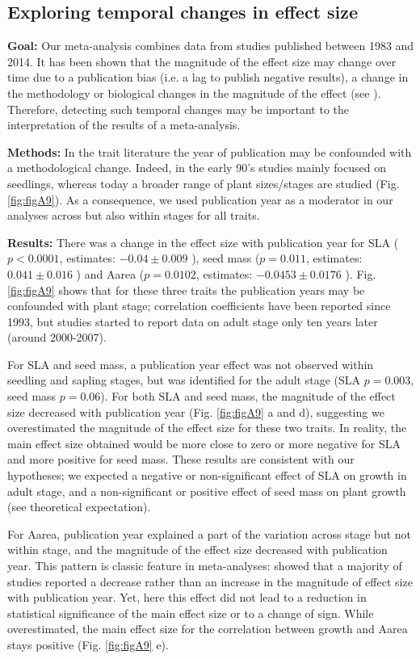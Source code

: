 \documentclass[a4paper,11pt]{article}
\begin{document}
\begin{appendices}
\subsection{Exploring temporal changes in effect size}
\noindent\textbf{Goal:} Our meta-analysis combines data from studies published between 1983 and 2014. It has been shown that the magnitude of the effect size may change over time due to a publication bias (i.e. a lag to publish negative results), a change in the methodology or biological changes in the magnitude of the effect (see \citealt{Koricheva:2013hy}). Therefore, detecting such temporal changes may be important to the interpretation of the results of a meta-analysis.

\noindent\textbf{Methods:} In the trait literature the year of publication may be confounded with a methodological change. Indeed, in the early 90's studies mainly focused on seedlings, whereas today a broader range of plant sizes/stages are studied (Fig. \ref{fig:figA9}). As a consequence, we used publication year as a moderator in our analyses \citep{Zvereva:2008jm} across but also within stages for all traits.

\noindent\textbf{Results:} There was a change in the effect size with publication year for SLA ($p<0.0001$, estimates: $-0.04 \pm 0.009$ ), seed mass ($p = 0.011$, estimates: $0.041 \pm 0.016$ ) and Aarea ($p = 0.0102$, estimates: $-0.0453 \pm 0.0176$ ). Fig. \ref{fig:figA9} shows that for these three traits the publication years may be confounded with plant stage; correlation coefficients have been reported since 1993, but studies started to report data on adult stage only ten years later (around 2000-2007).

For SLA and seed mass, a publication year effect was not observed within seedling and sapling stages, but was identified for the adult stage (SLA $p = 0.003$, seed mass $p = 0.06$). For both SLA and seed mass, the magnitude of the effect size decreased with publication year (Fig. \ref{fig:figA9} a and d), suggesting we overestimated the magnitude of the effect size for these two traits. In reality, the main effect size obtained would be more close to zero or more negative for SLA and more positive for seed mass. These results are consistent with our hypotheses; we expected a negative or non-significant effect of SLA on growth in adult stage, and a non-significant or positive effect of seed mass on plant growth (see theoretical expectation).

For Aarea, publication year explained a part of the variation across stage but not within stage, and the magnitude of the effect size decreased with publication year. This pattern is classic feature in meta-analyses: \citealt{Koricheva:2013hy} showed that a majority of studies reported a decrease rather than an increase in the magnitude of effect size with publication year. Yet, here this effect did not lead to a reduction in statistical significance of the main effect size or to a change of sign. While overestimated, the main effect size for the correlation between growth and Aarea stays positive (Fig. \ref{fig:figA9} e).


\end{appendices}
\end{document}
